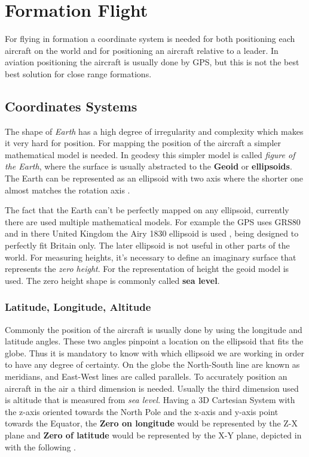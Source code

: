 \chapter{Formation Flight}
\label{chapter:formation-flight}
For flying in formation a coordinate system is needed for both positioning each 
aircraft on the world and for positioning an aircraft relative to a leader. In
aviation positioning the aircraft is usually done by GPS, but this is not the best best solution for close range formations.

\section{Coordinates Systems}
\label{sec:coordinates-systems}
The shape of \textit{Earth} has a high degree of irregularity and complexity
which makes it very hard for position. For mapping the position of
the aircraft a simpler mathematical model is needed. In geodesy this simpler
model is called \textit{figure of the Earth}, where the surface is usually
abstracted to the \textbf{Geoid} or \textbf{ellipsoids}. The Earth can be
represented as an ellipsoid with two axis where the shorter one almost matches the rotation axis \cite{gb-coordinates}.

The fact that the Earth can't be perfectly mapped on any ellipsoid, currently
there are used multiple mathematical models.
For example the GPS uses
GRS80 \cite{gsr80} and in there
United Kingdom the Airy 1830 ellipsoid is used \cite{gb-coordinates},  being 
designed to perfectly fit Britain only. The later ellipsoid is not useful in 
other parts of the world. For measuring heights, it's necessary to define an
imaginary surface that represents the \textit{zero height}. For the representation
of height the geoid model is used. The zero height shape is commonly called \textbf{sea level}.

\subsection{Latitude, Longitude,  Altitude}
\label{sub-sec:lla}
Commonly the position of the aircraft is usually done by using the longitude
  and latitude angles. These two angles pinpoint a location
on the ellipsoid that fits the globe. Thus it is mandatory to know with which
ellipsoid we are working in order to have any degree of certainty. On the globe
the North-South line are known as meridians,  and East-West lines are called 
parallels. To accurately position an aircraft in the air a third dimension is needed.
Usually the third dimension used is altitude that is measured from \textit{sea level}.
Having a 3D Cartesian System with the z-axis oriented towards the North Pole and
the x-axis and y-axis point towards the Equator, the \textbf{Zero on longitude}
would be represented by the Z-X plane and \textbf{Zero of latitude} would be 
represented by the X-Y plane, depicted in \cite{gb-coordinates} with the following
.
% 
\newpage

